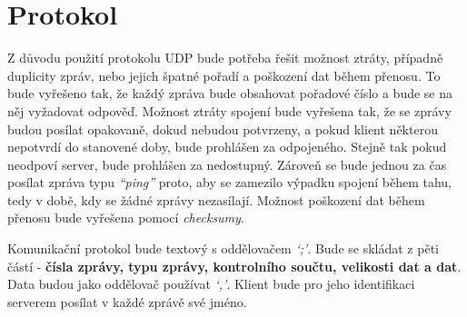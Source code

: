 \documentclass[12pt, a4paper]{article}
\begin{document}
	\section{Protokol}
	Z důvodu použití protokolu UDP bude potřeba řešit možnost ztráty, případně duplicity zpráv, nebo jejich špatné pořadí a poškození dat během přenosu. To bude vyřešeno tak, že každý zpráva bude obsahovat pořadové číslo a bude se na něj vyžadovat odpověď. Možnost ztráty spojení bude vyřešena tak, že se zprávy budou posílat opakovaně, dokud nebudou potvrzeny, a pokud klient některou nepotvrdí do stanovené doby, bude prohlášen za odpojeného. Stejně tak pokud neodpoví server, bude prohlášen za nedostupný. Zároveň se bude jednou za čas posílat zpráva typu \emph{“ping”} proto, aby se zamezilo výpadku spojení během tahu, tedy v době, kdy se žádné zprávy nezasílají. Možnost poškození dat během přenosu bude vyřešena pomocí \emph{checksumy}.

	Komunikační protokol bude textový s oddělovačem \emph{‘;’}. Bude se skládat z pěti částí - \textbf{čísla zprávy, typu zprávy, kontrolního součtu, velikosti dat a dat}. Data budou jako oddělovač používat \emph{‘,’}. Klient bude pro jeho identifikaci serverem posílat v každé zprávě své jméno.
	
\end{document}
